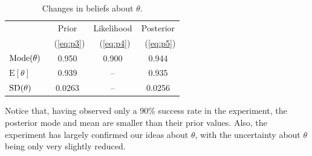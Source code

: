 {\begin{figure}[h!]
\end{figure}
\begin{table}[h!]
\bigskip

\begin{tabular}{|l|c|c|c|}
\cline{2-4}
\multicolumn{1}{c|}{~}& Prior & Likelihood & Posterior \\
\multicolumn{1}{c|}{~}&~(\ref{eq:p3})  &~(\ref{eq:p4}) & ~(\ref{eq:p5}) \\
\hline
$\textnormal{Mode}(\theta)$ & 0.950 & 0.900 & 0.944 \\
$\text{E}[\theta]$ & 0.939 & -- & 0.935 \\
$\textnormal{SD}(\theta)$ & 0.0263 & -- & 0.0256 \\
\hline
\end{tabular}
\caption{Changes in beliefs about $\theta$.}
\label{tab:betaplot4}

\end{table}

Notice that, having observed only a 90\% success rate in the experiment, the posterior mode and mean are smaller than their prior values. Also, the experiment has largely confirmed our ideas about $\theta$, with the uncertainty about $\theta$ being only very slightly reduced.}

\newpage

